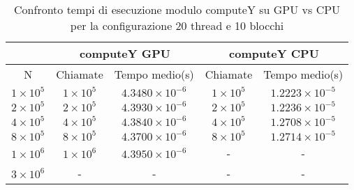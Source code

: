 \begin{table}[ht!]
    \begin{center}
        \renewcommand{\arraystretch}{1.5}
        \begin{adjustbox}{width=.65\textwidth}
            \begin{tabular}{ |c|c|c|c|c| }
                \hline
                \multicolumn{1}{|c}{} & \multicolumn{2}{|c}{computeY GPU} & \multicolumn{2}{|c|}{computeY CPU} \\
                \hline
                 N & Chiamate & Tempo medio(s) & Chiamate & Tempo medio(s) \\
                \hline 
                $1 \times 10^5$ & $1 \times 10^{5}$ & $4.3480 \times 10^{-6}$ & $1 \times 10^{5}$ & $1.2223 \times 10^{-5}$ \\ 
                \hline 
                $2 \times 10^5$ & $2 \times 10^{5}$ & $4.3930 \times 10^{-6}$ & $2 \times 10^{5}$ & $1.2236 \times 10^{-5}$ \\ 
                \hline 
                $4 \times 10^5$ & $4 \times 10^{5}$ & $4.3840 \times 10^{-6}$ & $4 \times 10^5$ & $1.2708 \times 10^{-5}$ \\ 
                \hline 
                $8 \times 10^5$ & $8 \times 10^{5}$ & $4.3700 \times 10^{-6}$ & $8 \times 10^5$ & $1.2714 \times 10^{-5}$ \\ 
                \hline 
                $1 \times 10^6$ & $1 \times 10^{6}$ & $4.3950 \times 10^{-6}$ & - & - \\ 
                \hline 
                 $3 \times 10^6$ & - & - & - & - \\ 
                \hline 
            \end{tabular}
        \end{adjustbox}
    \end{center}
    \caption{Confronto tempi di esecuzione modulo computeY su GPU vs CPU per la configurazione 20 thread e 10 blocchi}
    \label{tab:computeY_kernel_table_20x10}
\end{table}

